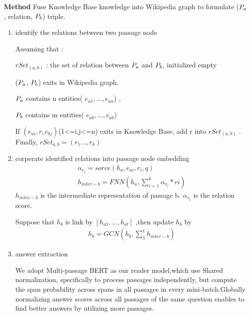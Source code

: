 \documentclass[sigconf]{acmart}
\begin{document}
	\textbf{Method} 
	Fuse Knowledge Base knowledge into Wikipedia graph to formulate
	($\MakeUppercase{p}_{a}$, relation, $\MakeUppercase{p}_{b}$) triple.
	\begin{enumerate}[(1)]
		
		\item identify the relations between two passage node
		
		Assuming that :
		
		
		$rSet_{(a,b)}$ : the set of relation between $\MakeUppercase{p}_a$ and $\MakeUppercase{p}_b$, initialized empty
		
		($\MakeUppercase{p}_a$, 	$\MakeUppercase{p}_b$) exits in Wikipedia graph.
		
		
		$\MakeUppercase{p}_a$ contains n entities( $e_{a1},...,e_{an}$) ,
		
		$\MakeUppercase{p}_b$ contains m entities( $e_{ab},...,e_{ab}$) 
		
		
		If $(e_{ai}, r, e_{bj})$(1<=i,j<=n) exits in Knowledge Base, add r into $rSet_{(a,b)}$ . Finally, $rSet_{a,b} = (r_{1}...,r_{k}) $
		
		\item corperate identified relations into passage node embedding
		\begin{displaymath}
			\begin{aligned}
			\alpha_{r_i} = sorce( h_{a},e_{ai},r_i,q) \\
			h_{inter-b}= FNN (h_{a}, \sum_{i=1}^{k} \alpha_{r_i}*ri)
			\end{aligned}
		\end{displaymath}
		$h_{inter-b}$ is the intermediate representation of passage b.
		$\alpha_{r_i}$ is the relation score.
	
		Suppose that  $h_{b}$ is link by  $[h_{a1},...,h_{at}]$ ,then update $h_{b}$ by 
		\begin{displaymath}
			\begin{aligned}
				h_{b}= GCN(h_{b}, \sum_{1}^{t} h_{inter-b})
			\end{aligned}
		\end{displaymath}

	
	\item answer extraction
	
	We adopt Multi-passage BERT \cite{2019Multi} as our reader model,which use Shared normalization\cite{2018Simple}, specifically to process passages independently, but compute the span probability across spans in all passages in every mini-batch.Globally normalizing answer scores across all passages of the same question enables to find better answers by utilizing more passages.
	

\end{enumerate}
\end{document}
